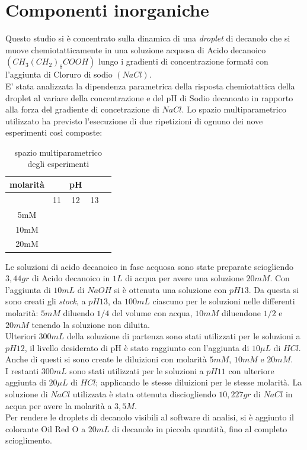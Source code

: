 \section{Componenti inorganiche}
\label{sec:123}
Questo studio si è concentrato sulla dinamica di una \emph{droplet} di decanolo  che si muove chemiotatticamente in una soluzione acquosa di Acido decanoico $(CH_{3}(CH_{2})_8COOH)$ lungo i gradienti di concentrazione formati con l'aggiunta di Cloruro di sodio $(NaCl)$.\cite{ikea}
\\E' stata analizzata la dipendenza parametrica della risposta chemiotattica della droplet al variare della concentrazione e del pH di Sodio decanoato in rapporto alla forza del gradiente di concetrazione di $NaCl$. 
Lo spazio multiparametrico utilizzato ha previsto l'esecuzione di due ripetizioni di ognuno dei nove esperimenti così composte: 
\begin{table}[htbp] 
  \begin{center} 
    \begin{tabular}{c|cccc} 
      \textbf{molarità} & & \textbf{pH}\\ 
      \midrule 
	& 11 & 12 & 13\\ 
\hline
	5mM\\
\hline
	10mM\\
\hline
	20mM\\ 
	\hline 
     \end{tabular} 
   \end{center} 
	\caption{spazio multiparametrico degli esperimenti}
\end{table}

Le soluzioni di acido decanoico in fase acquosa sono state preparate sciogliendo $3,44gr$ di Acido decanoico  in $1L$ di acqua per avere una soluzione $20mM$. Con l'aggiunta di $10mL$ di $NaOH$ si è ottenuta una soluzione con $pH 13$. 
Da questa si sono creati gli \emph{stock}, a $pH13$, da $100mL$ ciascuno per le soluzioni nelle differenti molarità: $5mM$ diluendo $1/4$ del volume con acqua, $10mM$ diluendone $1/2$ e $20mM$ tenendo la soluzione non diluita.
\\Ulteriori $300mL$ della soluzione di partenza sono stati utilizzati per le soluzioni a $pH 12$, il livello desiderato di pH è stato raggiunto con l'aggiunta di $10\mu L$ di $HCl$. Anche di questi si sono create le diluizioni con molarità $5mM$, $10mM$ e $20mM$. 
\\I restanti $300mL$ sono stati utilizzati per le soluzioni a $pH11$ con ulteriore aggiunta di $20\mu L$ di $HCl$; applicando le stesse diluizioni per le stesse molarità.
La soluzione di $NaCl$ utilizzata è stata ottenuta disciogliendo $10,227gr$ di $NaCl$ in acqua per avere la molarità a $3,5M$.
\\Per rendere le droplets di decanolo visibili al software di analisi, si è aggiunto il colorante Oil Red O a $20mL$ di decanolo in piccola quantità, fino al completo scioglimento.  






